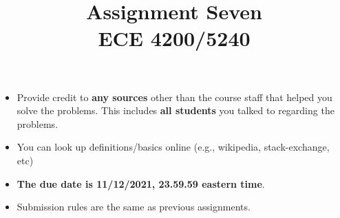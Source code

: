 \documentclass[11pt]{article}
\title{Assignment Seven\\ ECE 4200/5240}
\date{}
\newenvironment{problem}[2][Problem]{\begin{trivlist}
\item[\hskip \labelsep {\bfseries #1}\hskip \labelsep {\bfseries #2.}]}{\end{trivlist}}
\begin{document}
\maketitle 

\begin{itemize}
\item
Provide credit to \textbf{any sources} other than the course staff that helped you solve the problems. This includes \textbf{all students} you talked to regarding the problems. 	
\item
You can look up definitions/basics online (e.g., wikipedia, stack-exchange, etc)
\item
{\bf The due date is 11/12/2021, 23.59.59 eastern time}. 
\item
Submission rules are the same as previous assignments.
\end{itemize}




\end{document}
